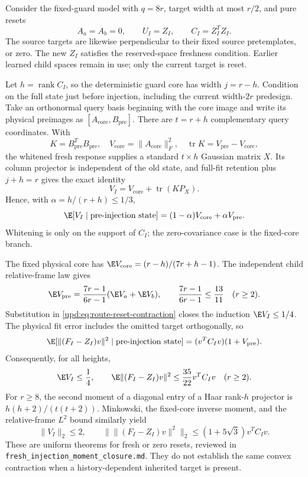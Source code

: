 \documentclass[11pt,oneside,openany,a4paper]{book}
\numberwithin{equation}{chapter}
\theoremstyle{definition}
\theoremstyle{remark}
\DeclareMathOperator{\tr}{tr}\DeclareMathOperator{\rank}{rank}
\newcommand{\sourcefile}[1]{{\small\nolinkurl{#1}}}
\begin{document}
Consider the fixed-guard model with $q=8r$, target width at most $r/2$,
and pure resets
\[
 A_a=A_b=0,\qquad U_I=Z_I,\qquad C_I=Z_I^TZ_I.
\]
The source targets are likewise perpendicular to their fixed source
pretemplates, or zero.  The new $Z_I$ satisfies the reserved-space
freshness condition.  Earlier learned child spaces remain in use; only
the current target is reset.

Let $h=\rank C_I$, so the deterministic guard core has width $j=r-h$.
Condition on the full state just before injection, including the
current width-$2r$ predesign.  Take an orthonormal query basis beginning
with the core image and write its physical preimages as
$[A_{\mathrm{core}},B_{\mathrm{pre}}]$.  There are $t=r+h$
complementary query coordinates.  With
\[
 K=B_{\mathrm{pre}}^TB_{\mathrm{pre}},\quad
 V_{\mathrm{core}}=\lVert A_{\mathrm{core}}\rVert_F^2,
 \quad \tr K=V_{\mathrm{pre}}-V_{\mathrm{core}},
\]
the whitened fresh response supplies a standard $t\times h$ Gaussian
matrix $X$.  Its column projector is independent of the old state, and
full-fit retention plus $j+h=r$ gives the exact identity
\begin{equation}
 V_I=V_{\mathrm{core}}+\tr(KP_X).
 \label{upd:eq:route-reset-projector}
\end{equation}
Hence, with $\alpha=h/(r+h)\leq1/3$,
\begin{equation}
 \E[V_I\mid\text{pre-injection state}]
 =(1-\alpha)V_{\mathrm{core}}+\alpha V_{\mathrm{pre}}.
 \label{upd:eq:route-reset-contraction}
\end{equation}
Whitening is only on the support of $C_I$; the zero-covariance case is
the fixed-core branch.

The fixed physical core has
$\E V_{\mathrm{core}}=(r-h)/(7r+h-1)$.  The independent child
relative-frame law gives
\[
 \E V_{\mathrm{pre}}
 =\frac{7r-1}{6r-1}(\E V_a+\E V_b),
 \qquad\frac{7r-1}{6r-1}\leq\frac{13}{11}\quad(r\geq2).
\]
Substitution in \eqref{upd:eq:route-reset-contraction} closes the induction
$\E V_I\leq1/4$.  The physical fit error includes the omitted target
orthogonally, so
\[
 \E[\lVert(F_I-Z_I)v\rVert^2\mid\text{pre-injection state}]
 =(v^TC_Iv)(1+V_{\mathrm{pre}}).
\]
Consequently, for all heights,
\begin{equation}
 \E V_I\leq\frac14,\qquad
 \E\lVert(F_I-Z_I)v\rVert^2\leq\frac{35}{22}v^TC_Iv
 \quad(r\geq2).
 \label{upd:eq:route-reset-mean}
\end{equation}
For $r\geq8$, the second moment of a diagonal entry of a Haar rank-$h$
projector is $h(h+2)/(t(t+2))$.  Minkowski, the fixed-core inverse
moment, and the relative-frame $L^2$ bound similarly yield
\begin{equation}
 \|V_I\|_2\leq2,\qquad
 \|\lVert(F_I-Z_I)v\rVert^2\|_2
 \leq(1+5\sqrt3)v^TC_Iv.
 \label{upd:eq:route-reset-second}
\end{equation}
These are uniform theorems for fresh or zero resets, reviewed in
\sourcefile{fresh_injection_moment_closure.md}.  They do not establish
the same convex contraction when a history-dependent inherited target
is present.
\end{document}
